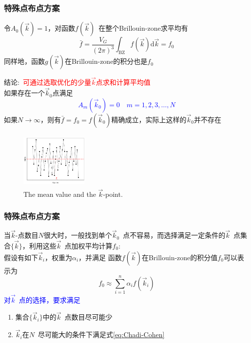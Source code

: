\frame
{
	\frametitle{特殊点布点方案}
	令$A_0(\vec k)=1$，对函数$f(\vec k)$~在整个\textrm{Brillouin-zone}求平均有
	$$\bar f=\dfrac{V_G}{(2\pi)^3}\int_{\mathrm{BZ}}f(\vec k)\mathrm{d}\vec k=f_0$$
	同样地，函数$g(\vec k)$在\textrm{Brillouin-zone}的积分也是$f_0$

	结论:~\textcolor{red}{可通过选取优化的少量$\vec k$点求和计算平均值}\\如果存在一个$\vec k_0$点满足\textcolor{blue}{
	$$A_m(\vec k_0)=0\quad m=1,2,3,\dots,N$$}
	如果$N\rightarrow\infty$，则有$\bar f=f_0=f(\vec k_0)$精确成立，实际上这样的$\vec k_0$并不存在
\begin{figure}[h!]
\centering
\vspace*{-0.2in}
\includegraphics[height=1.1in,width=1.3in,viewport=5 0 960 750,clip]{Figures/Brillouin-k.png}
\caption{\tiny \textrm{The mean value and the $\vec k$-point.}}%
\label{Brillouin-k}
\end{figure} 
}

\frame
{
	\frametitle{特殊点布点方案}
	当$\vec k$-点数目$N$很大时，一般找到单个$\vec k_0$~点不容易，而选择满足一定条件的$\vec k$~点集合$\{\vec k\}$，利用这些$\vec k$~点加权平均计算$f_0$:\\
	假设有如下$\vec k_i$，权重为$\alpha_i$，并满足
	{\fontsize{9.0pt}{3.9pt}}
	函数$f(\vec k)$在\textrm{Brillouin-zone}的积分值$f_0$可以表示为$$f_0\approx\sum_{i=1}^n\alpha_if(\vec k_i)$$
	\textcolor{blue}{对$\vec k$~点的选择，要求满足}
	\begin{enumerate}
		\item 集合$\{\vec k_i\}$中的$\vec k$~点数目尽可能少
		\item $\vec k_i$在$N$~尽可能大的条件下满足式\eqref{eq:Chadi-Cohen}
	\end{enumerate}
}

